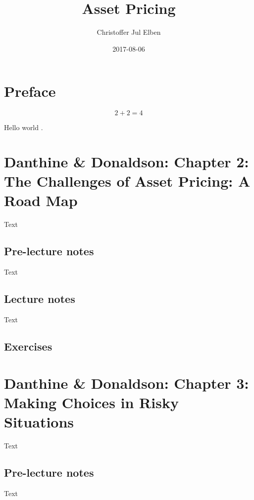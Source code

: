\documentclass[]{book}
\title{Asset Pricing}
\author{Christoffer Jul Elben}
\date{2017-08-06}
\theoremstyle{definition}
\theoremstyle{definition}
\theoremstyle{remark}
\begin{document}
\maketitle

{
\setcounter{tocdepth}{1}
\tableofcontents
}
\chapter{Preface}\label{preface}

\[2+2=4\]

Hello world \citep[p.~123]{book_danthine} \citep[p.~123]{book_veronesi}.

\chapter{Danthine \& Donaldson: Chapter 2: The Challenges of Asset
Pricing: A Road
Map}\label{danthine-donaldson-chapter-2-the-challenges-of-asset-pricing-a-road-map}

Text

\section{Pre-lecture notes}\label{pre-lecture-notes}

Text

\section{Lecture notes}\label{lecture-notes}

Text

\section{Exercises}\label{exercises}

\chapter{Danthine \& Donaldson: Chapter 3: Making Choices in Risky
Situations}\label{danthine-donaldson-chapter-3-making-choices-in-risky-situations}

Text

\section{Pre-lecture notes}\label{pre-lecture-notes-1}

Text
\end{document}
